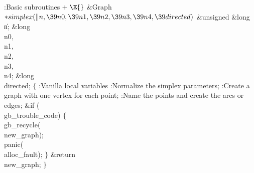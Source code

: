 \fi

\B{}:Basic subroutines\X${}\mathrel+\E{}$\6
\1\1\&{Graph} ${}{*}\\{simplex}(\|n,\39\\{n0},\39\\{n1},\39\\{n2},\39\\{n3},\39%
\\{n4},\39\\{directed}){}$\6
\&{unsigned} \&{long} \|n;\6
\&{long} \\{n0}${},{}$ \\{n1}${},{}$ \\{n2}${},{}$ \\{n3}${},{}$ \\{n4};\6
\&{long} \\{directed};\2\2\6
${}\{{}$\5
\1:Vanilla local variables\X\7
:Normalize the simplex parameters\X;\6
:Create a graph with one vertex for each point\X;\6
:Name the points and create the arcs or edges\X;\6
\&{if} (\\{gb\_trouble\_code})\5
${}\{{}$\1\6
\\{gb\_recycle}(\\{new\_graph});\6
\\{panic}(\\{alloc\_fault});\6
\4${}\}{}$\2\6
\&{return} \\{new\_graph};\6
\4${}\}{}$\2\par
\fi

